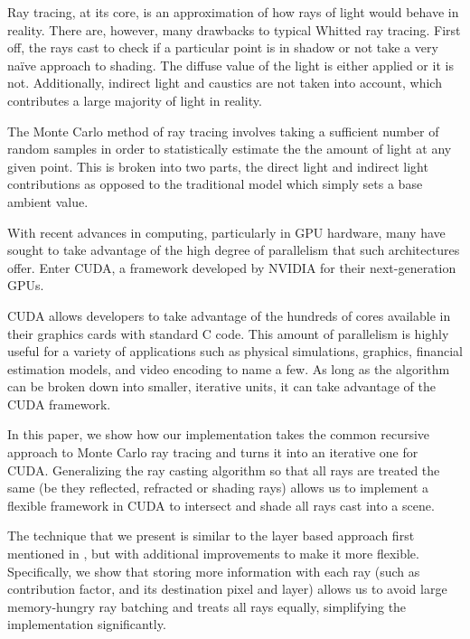 \documentclass{acmsiggraph}                     %
\begin{document}
    Ray tracing, at its core, is an approximation of how rays of light would behave in reality.
    There are, however, many drawbacks to typical Whitted ray tracing. First off, the rays 
    cast to check if a particular point is in shadow or not take a very na\"{i}ve approach 
    to shading. The diffuse value of the light is either applied or it is not. Additionally,
    indirect light and caustics are not taken into account, which contributes a large majority
    of light in reality.

    The Monte Carlo method of ray tracing involves taking a sufficient number of random samples 
    in order to statistically estimate the the amount of light at any given point. This is broken
    into two parts, the direct light and indirect light contributions as opposed to the traditional
    model which simply sets a base ambient value.

    With recent advances in computing, particularly in GPU hardware, many have sought 
    to take advantage of the high degree of parallelism that such architectures offer. 
    Enter CUDA, a framework developed by NVIDIA for their next-generation GPUs.

    CUDA allows developers to take advantage of the hundreds of cores available in their graphics 
    cards with standard C code. This amount of parallelism is highly useful for a variety of
    applications such as physical simulations, graphics, financial estimation models, and video
    encoding to name a few.  As long as the algorithm can be broken down into smaller, iterative
    units, it can take advantage of the CUDA framework.

    In this paper, we show how our implementation takes the common recursive approach to Monte Carlo
    ray tracing and turns it into an iterative one for CUDA. Generalizing the ray casting algorithm
    so that all rays are treated the same (be they reflected, refracted or shading rays) allows us
    to implement a flexible framework in CUDA to intersect and shade all rays cast into a scene.

    The technique that we present is similar to the layer based approach first mentioned 
    in \cite{Segovia09}, but with additional improvements to make it more flexible. Specifically, we 
    show that storing more information with each ray (such as contribution factor, and its destination
    pixel and layer) allows us to avoid large memory-hungry ray batching and treats all rays equally,
    simplifying the implementation significantly.
\end{document}
